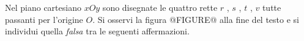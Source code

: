Nel piano cartesiano \( \displaystyle {xOy}\) sono disegnate le quattro rette 
\( \displaystyle r\) , \( \displaystyle s\) , \( \displaystyle t\) , \( \displaystyle v\) tutte passanti per
l’origine \( \displaystyle O\). Si osservi la figura 
@FIGURE@ alla fine del testo
e si individui quella \emph{falsa} tra le seguenti affermazioni.

